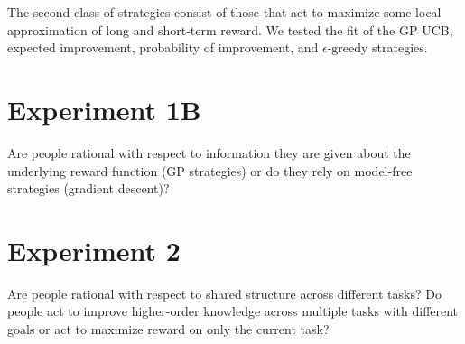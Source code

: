 \documentclass[10pt,letterpaper]{article}
\begin{document}
	The second class of strategies consist of those that act to maximize some local approximation of long and short-term reward. We tested the fit of the GP UCB, expected improvement, probability of improvement, and $\epsilon \text{-greedy}$ strategies.
	
	\section{Experiment 1B}
	
	Are people rational with respect to information they are given about the underlying reward function (GP strategies) or do they rely on model-free strategies (gradient descent)?
	
	\section{Experiment 2}
	
	Are people rational with respect to shared structure across different tasks? Do people act to improve higher-order knowledge across multiple tasks with different goals or act to maximize reward on only the current task?
	
	
	
	\setlength{\bibleftmargin}{.125in}
	\setlength{\bibindent}{-\bibleftmargin}
	
	
		
	
\end{document}
